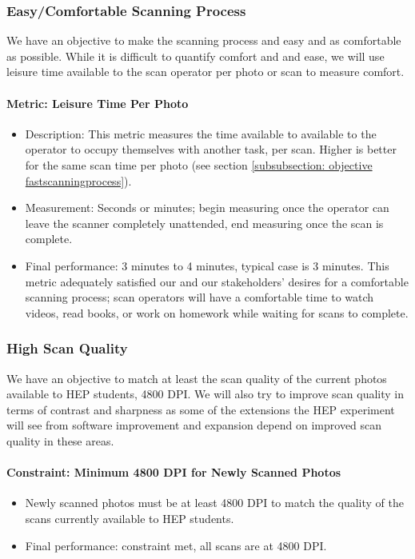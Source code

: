 \documentclass[12pt]{article} %
\begin{document}
\subsubsection{Easy/Comfortable Scanning Process} \label{obj easy scan proc}
We have an objective to make the scanning process and easy and as comfortable as possible. While it is difficult to quantify comfort and and ease, we will use leisure time available to the scan operator per photo or scan to measure comfort.

\paragraph{Metric: Leisure Time Per Photo}
\begin{itemize}
    \item Description: This metric measures the time available to available to the operator to occupy themselves with another task, per scan. Higher is better for the same scan time per photo (see section \ref{subsubsection: objective fastscanningprocess}).
    \item Measurement: Seconds or minutes; begin measuring once the operator can leave the scanner completely unattended, end measuring once the scan is complete.
    \item Final performance: 3 minutes to 4 minutes, typical case is 3 minutes. This metric adequately satisfied our and our stakeholders' desires for a comfortable scanning process; scan operators will have a comfortable time to watch videos, read books, or work on homework while waiting for scans to complete.
\end{itemize}

\subsubsection{High Scan Quality} \label{obj high scan quality}
We have an objective to match at least the scan quality of the current photos available to HEP students, 4800 DPI. We will also try to improve scan quality in terms of contrast and sharpness as some of the extensions the HEP experiment will see from software improvement and expansion depend on improved scan quality in these areas.

\paragraph{Constraint: Minimum 4800 DPI for Newly Scanned Photos}
\begin{itemize}
    \item Newly scanned photos must be at least 4800 DPI to match the quality of the scans currently available to HEP students.
    \item Final performance: constraint met, all scans are at 4800 DPI.
\end{itemize}
\end{document}
